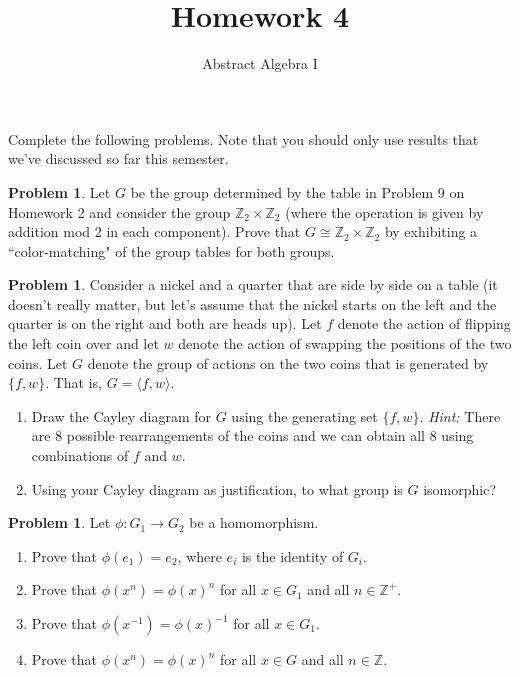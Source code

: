 \documentclass[11pt]{scrartcl}
\theoremstyle{definition}
\newtheorem{problem}[theorem]{Problem}
\begin{document}
\title{Homework 4}
\subtitle{Abstract Algebra I}
\date{}

\maketitle
\thispagestyle{fancy}

Complete the following problems. Note that you should only use results that we've discussed so far this semester. 

\begin{problem}
Let $G$ be the group determined by the table in Problem 9 on Homework 2 and consider the group $\mathbb{Z}_2\times \mathbb{Z}_2$ (where the operation is given by addition mod 2 in each component).  Prove that $G\cong \mathbb{Z}_2\times \mathbb{Z}_2$ by exhibiting a ``color-matching" of the group tables for both groups.
\end{problem}

\begin{problem}
Consider a nickel and a quarter that are side by side on a table (it doesn't really matter, but let's assume that the nickel starts on the left and the quarter is on the right and both are heads up).  Let $f$ denote the action of flipping the left coin over and let $w$ denote the action of swapping the positions of the two coins.  Let $G$ denote the group of actions on the two coins that is generated by $\{f,w\}$. That is, $G=\langle f,w\rangle$.
\begin{enumerate}[label=\rm{(\alph*)}]
\item Draw the Cayley diagram for $G$ using the generating set $\{f,w\}$. \emph{Hint:} There are 8 possible rearrangements of the coins and we can obtain all 8 using combinations of $f$ and $w$.
\item Using your Cayley diagram as justification, to what group is $G$ isomorphic?
\end{enumerate}
\end{problem}

\begin{problem}
Let $\phi:G_1\to G_2$ be a homomorphism.
\begin{enumerate}[label=\rm{(\alph*)}]
\item Prove that $\phi(e_1)=e_2$, where $e_i$ is the identity of $G_i$.
\item Prove that $\phi(x^n)=\phi(x)^n$ for all $x\in G_1$ and all $n\in\mathbb{Z}^+$.
\item Prove that $\phi(x^{-1})=\phi(x)^{-1}$ for all $x\in G_1$.
\item Prove that $\phi(x^n)=\phi(x)^n$ for all $x\in G$ and all $n\in\mathbb{Z}$.
\end{enumerate}
\end{problem}
\end{document}
